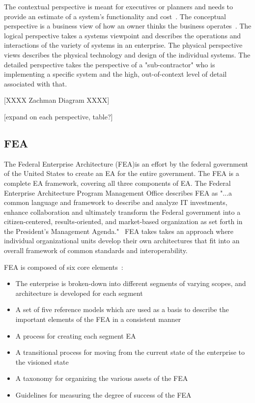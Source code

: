 The contextual perspective is meant for executives or planners and needs to provide an estimate of a system's functionality and cost~\cite{jungle2004}. The conceptual perspective is a business view of how an owner thinks the business operates~\cite{Zachman2000}. The logical perspective takes a systems viewpoint and describes the operations and interactions of the variety of systems in an enterprise. The physical perspective views describes the physical technology and design of the individual systems. The detailed perspective takes the perspective of a "sub-contractor" who is implementing a specific system and the high, out-of-context level of detail associated with that.
 
[XXXX Zachman Diagram XXXX]

[expand on each perspective, table?]

\subsection{FEA}
The Federal Enterprise Architecture (FEA)is an effort by the federal government of the United States to create an EA for the entire government. The FEA is a complete EA framework, covering all three components of EA. The Federal Enterprise Architecture Program Management Office describes FEA as "...a common language and framework to describe and analyze IT investments, enhance collaboration and ultimately transform the Federal government into a citizen-centered, results-oriented, and market-based organization as set forth in the President's Management Agenda."~\cite{FederalEnterpriseArchitectureProgramManagementOffice} FEA takes takes an approach where individual organizational units develop their own architectures that fit into an overall framework of common standards and interoperability.

FEA is composed of six core elements~\cite{sessions2007}:
\begin{itemize}
    \item The enterprise is broken-down into different segments of varying scopes, and architecture is developed for each segment
    \item A set of five reference models which are used as a basis to describe the important elements of the FEA in a consistent manner
    \item A process for creating each segment EA
    \item A transitional process for moving from the current state of the enterprise to the visioned state
    \item A taxonomy for organizing the various assets of the FEA
    \item Guidelines for measuring the degree of success of the FEA
\end{itemize}

